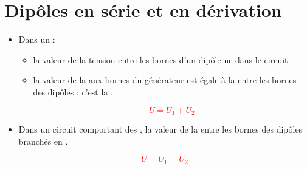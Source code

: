 \documentclass[xcolor={dvipsnames}]{beamer}
\begin{document}
\section{Dipôles en série et en dérivation}


\begin{frame}

	\begin{block}

	
		\begin{itemize}
			\item Dans un  :
			\begin{itemize}
				\item la valeur de la tension entre les bornes d'un dipôle ne  dans le circuit.
				\item la valeur de la  aux bornes du générateur est égale à la  entre les bornes des dipôles : c'est la .
				

				\vspace*{-0.5cm}
				
				{\Large \textcolor{red}{\begin{equation*}
					U=U_1+U_2
				\end{equation*}}}
				\vspace*{-0.5cm}
				
			\end{itemize}
			
			\item Dans un circuit comportant des , la valeur de la  entre les bornes des dipôles branchés en .
			
				\vspace*{-0.5cm}

			{\Large \textcolor{red}{\begin{equation*}
				U=U_1=U_2
			\end{equation*}}}
			\vspace*{-0.5cm}
		\end{itemize}
	\end{block}
\end{frame}

%
%	
%
%
%	
\end{document}
